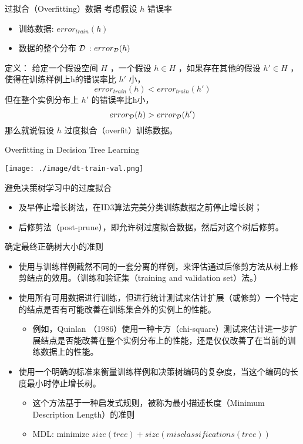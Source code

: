 \documentclass[presentation]{beamer}
\begin{document}
\begin{frame}[label={sec:orgf65fe7c}]{过拟合（Overfitting）数据}
考虑假设 \(h\) 错误率
\begin{itemize}
\item 训练数据: \(error_{train}(h)\)
\item 数据的整个分布  \(\cal{D}\) : \(error_{\cal{D}}(h)\)
\end{itemize}

定义： 给定一个假设空间 \(H\) ，一个假设 \(h\in H\) ，如果存在其他的假设 \(h'\in H\) ，使得在训练样例上h的错误率比 \(h'\) 小，
\[  error_{train}(h) < error_{train}(h') \]
但在整个实例分布上 \(h'\) 的错误率比h小，
\[  error_{\cal{D}}(h) > error_{\cal{D}}(h') \]
那么就说假设 \(h\) 过度拟合（overfit）训练数据。
\end{frame}


\begin{frame}[label={sec:orgff0da57}]{Overfitting in Decision Tree Learning}
\begin{center}
\texttt{[image: ./image/dt-train-val.png]}
\end{center}
\end{frame}

\begin{frame}[label={sec:org80e0643}]{避免决策树学习中的过度拟合}
\begin{itemize}
\item 及早停止增长树法，在ID3算法完美分类训练数据之前停止增长树；
\item 后修剪法（post-prune），即允许树过度拟合数据，然后对这个树后修剪。
\end{itemize}
\end{frame}

\begin{frame}[label={sec:org79ea555}]{确定最终正确树大小的准则}
\begin{itemize}
\item 使用与训练样例截然不同的一套分离的样例，来评估通过后修剪方法从树上修剪结点的效用。（训练和验证集（training and validation set）法。）
\item 使用所有可用数据进行训练，但进行统计测试来估计扩展（或修剪）一个特定的结点是否有可能改善在训练集合外的实例上的性能。
\begin{itemize}
\item 例如，Quinlan （1986）使用一种卡方（chi-square）测试来估计进一步扩展结点是否能改善在整个实例分布上的性能，还是仅仅改善了在当前的训练数据上的性能。
\end{itemize}
\item 使用一个明确的标准来衡量训练样例和决策树编码的复杂度，当这个编码的长度最小时停止增长树。
\begin{itemize}
\item 这个方法基于一种启发式规则，被称为最小描述长度（Minimum Description Length）的准则
\item MDL: minimize \(size(tree) + size(misclassifications(tree))\)
\end{itemize}
\end{itemize}
\end{frame}
\end{document}
